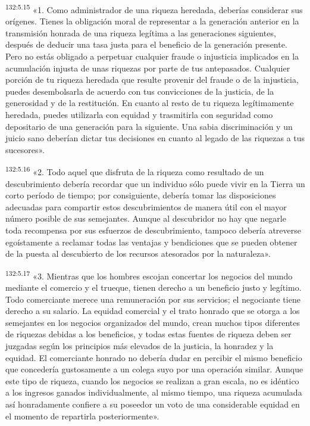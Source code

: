\par 
\textsuperscript{132:5.15} «1. Como administrador de una riqueza heredada, deberías considerar sus orígenes. Tienes la obligación moral de representar a la generación anterior en la transmisión honrada de una riqueza legítima a las generaciones siguientes, después de deducir una tasa justa para el beneficio de la generación presente. Pero no estás obligado a perpetuar cualquier fraude o injusticia implicados en la acumulación injusta de unas riquezas por parte de tus antepasados. Cualquier porción de tu riqueza heredada que resulte provenir del fraude o de la injusticia, puedes desembolsarla de acuerdo con tus convicciones de la justicia, de la generosidad y de la restitución. En cuanto al resto de tu riqueza legítimamente heredada, puedes utilizarla con equidad y trasmitirla con seguridad como depositario de una generación para la siguiente. Una sabia discriminación y un juicio sano deberían dictar tus decisiones en cuanto al legado de las riquezas a tus sucesores».

\par 
\textsuperscript{132:5.16} «2. Todo aquel que disfruta de la riqueza como resultado de un descubrimiento debería recordar que un individuo sólo puede vivir en la Tierra un corto período de tiempo; por consiguiente, debería tomar las disposiciones adecuadas para compartir estos descubrimientos de manera útil con el mayor número posible de sus semejantes. Aunque al descubridor no hay que negarle toda recompensa por sus esfuerzos de descubrimiento, tampoco debería atreverse egoístamente a reclamar todas las ventajas y bendiciones que se pueden obtener de la puesta al descubierto de los recursos atesorados por la naturaleza».

\par 
\textsuperscript{132:5.17} «3. Mientras que los hombres escojan concertar los negocios del mundo mediante el comercio y el trueque, tienen derecho a un beneficio justo y legítimo. Todo comerciante merece una remuneración por sus servicios; el negociante tiene derecho a su salario. La equidad comercial y el trato honrado que se otorga a los semejantes en los negocios organizados del mundo, crean muchos tipos diferentes de riquezas debidas a los beneficios, y todas estas fuentes de riqueza deben ser juzgadas según los principios más elevados de la justicia, la honradez y la equidad. El comerciante honrado no debería dudar en percibir el mismo beneficio que concedería gustosamente a un colega suyo por una operación similar. Aunque este tipo de riqueza, cuando los negocios se realizan a gran escala, no es idéntico a los ingresos ganados individualmente, al mismo tiempo, una riqueza acumulada así honradamente confiere a su poseedor un voto de una considerable equidad en el momento de repartirla posteriormente».

